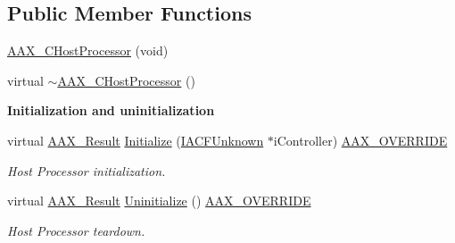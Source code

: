\subsection*{Public Member Functions}
\begin{DoxyCompactItemize}
\item 
\hyperlink{a00020_ab9c80cadc9eee6d44713eac97d0a4e09}{A\+A\+X\+\_\+\+C\+Host\+Processor} (void)
\item 
virtual \hyperlink{a00020_a292b055693eace03d45b3a550dbefa50}{$\sim$\+A\+A\+X\+\_\+\+C\+Host\+Processor} ()
\end{DoxyCompactItemize}
\begin{Indent}{\bf Initialization and uninitialization}\par
\begin{DoxyCompactItemize}
\item 
virtual \hyperlink{a00149_a4d8f69a697df7f70c3a8e9b8ee130d2f}{A\+A\+X\+\_\+\+Result} \hyperlink{a00020_a9fa45d23e62ae69192997b385129cf6b}{Initialize} (\hyperlink{a00146}{I\+A\+C\+F\+Unknown} $\ast$i\+Controller) \hyperlink{a00149_ac2f24a5172689ae684344abdcce55463}{A\+A\+X\+\_\+\+O\+V\+E\+R\+R\+I\+D\+E}
\begin{DoxyCompactList}\small\item\em Host Processor initialization. \end{DoxyCompactList}\item 
virtual \hyperlink{a00149_a4d8f69a697df7f70c3a8e9b8ee130d2f}{A\+A\+X\+\_\+\+Result} \hyperlink{a00020_a2047f4ec04271a975971a126b290688d}{Uninitialize} () \hyperlink{a00149_ac2f24a5172689ae684344abdcce55463}{A\+A\+X\+\_\+\+O\+V\+E\+R\+R\+I\+D\+E}
\begin{DoxyCompactList}\small\item\em Host Processor teardown. \end{DoxyCompactList}\end{DoxyCompactItemize}
\end{Indent}
